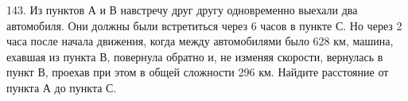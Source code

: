143. Из пунктов А и В навстречу друг другу одновременно выехали два автомобиля. Они должны были встретиться через 6 часов в пункте С. Но через 2 часа после начала движения, когда между автомобилями было 628 км, машина, ехавшая из пункта В, повернула обратно и, не изменяя скорости, вернулась в пункт В, проехав при этом в общей сложности 296 км. Найдите расстояние от пункта А до пункта С.\\
